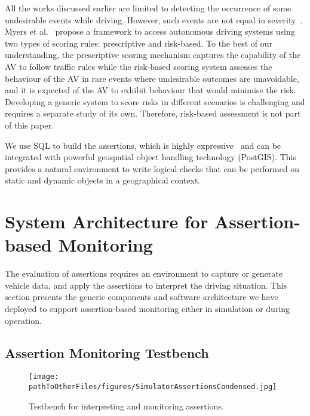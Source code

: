 All the works discussed earlier are limited to detecting the occurrence of some undesirable events while driving. However, such events are not equal in severity~\cite{sinha}. Myers et al.~\cite{myers} propose a framework to access autonomous driving systems using two types of scoring rules: prescriptive and risk-based. To the best of our understanding, the prescriptive scoring mechanism captures the capability of the AV to follow traffic rules while the risk-based scoring system assesses the behaviour of the AV in rare events where undesirable outcomes are unavoidable, and it is expected of the AV to exhibit behaviour that would minimise the risk. Developing a generic system to score risks in different scenarios is challenging and requires a separate study of its own. Therefore, risk-based assessment is not part of this paper.

We use SQL to build the assertions, which is highly expressive~\cite{sqllibkin} and can be integrated with powerful geospatial object handling technology (PostGIS). This provides a natural environment to write logical checks that can be performed on static and dynamic objects in a geographical context. 
%



\section{System Architecture for Assertion-based Monitoring} \label{generic_architecture}

The evaluation of assertions requires an environment to capture or generate vehicle data, and apply the assertions to interpret the driving situation. This section presents the generic components and software architecture we have deployed to support assertion-based monitoring either in simulation or during operation.

\subsection{Assertion Monitoring Testbench} \label{generic_sim_system}

\begin{figure}
    \centering
    \texttt{[image: \\pathToOtherFiles/figures/SimulatorAssertionsCondensed.jpg]}
    \caption{Testbench for interpreting and monitoring assertions.}
    \label{fig:SimulatorArchitecture}
\end{figure}



